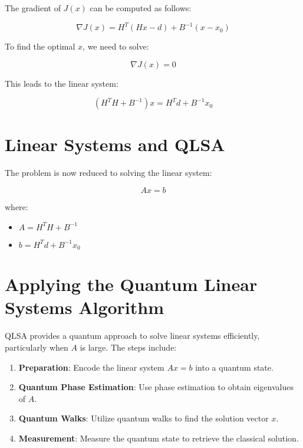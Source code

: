 \documentclass{article}
\begin{document}
The gradient of \( J(x) \) can be computed as follows:

\begin{equation}
\nabla J(x) = H^T(Hx - d) + B^{-1}(x - x_0)
\end{equation}

To find the optimal \( x \), we need to solve:

\begin{equation}
\nabla J(x) = 0
\end{equation}

This leads to the linear system:

\begin{equation}
(H^TH + B^{-1})x = H^Td + B^{-1}x_0
\end{equation}

\section{Linear Systems and QLSA}

The problem is now reduced to solving the linear system:

\begin{equation}
Ax = b
\end{equation}

where:
\begin{itemize}
    \item \( A = H^TH + B^{-1} \)
    \item \( b = H^Td + B^{-1}x_0 \)
\end{itemize}

\section{Applying the Quantum Linear Systems Algorithm}

QLSA provides a quantum approach to solve linear systems efficiently, particularly when \( A \) is large. The steps include:

\begin{enumerate}
    \item \textbf{Preparation}: Encode the linear system \( Ax = b \) into a quantum state.
    \item \textbf{Quantum Phase Estimation}: Use phase estimation to obtain eigenvalues of \( A \).
    \item \textbf{Quantum Walks}: Utilize quantum walks to find the solution vector \( x \).
    \item \textbf{Measurement}: Measure the quantum state to retrieve the classical solution.
\end{enumerate}
\end{document}
